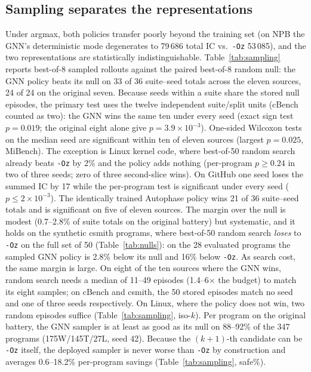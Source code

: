 \documentclass[conference,a4paper]{IEEEtran}
\begin{document}
\subsection{Sampling separates the representations}
Under argmax, both policies transfer poorly beyond the training set
(on NPB the GNN's deterministic mode degenerates to 79\,686 total IC
vs.\ \texttt{-Oz} 53\,085), and the two representations are
statistically indistinguishable.
Table~\ref{tab:sampling} reports best-of-8 sampled rollouts against the
paired best-of-8 random null: the GNN policy beats its null on 33 of 36
suite--seed totals across the eleven sources, 24 of 24 on the original
seven. Because seeds within a suite share the stored null episodes, the
primary test uses the twelve independent suite/split units (cBench
counted as two): the GNN wins the same
ten under every seed (exact sign test $p{=}0.019$; the original eight
alone give $p{=}3.9{\times}10^{-3}$). One-sided Wilcoxon tests on the
median seed are significant within ten of eleven sources (largest
$p{=}0.025$, MiBench). The exception is Linux kernel code, where
best-of-50 random search already beats \texttt{-Oz} by 2\% and the
policy adds nothing (per-program $p{\ge}0.24$ in two of three seeds;
zero of three second-slice wins). On GitHub one seed loses the summed
IC by 17 while the per-program test is significant under every seed
($p{\le}2{\times}10^{-3}$). The identically trained Autophase policy
wins 21 of 36 suite--seed totals and is significant on five of eleven
sources. The margin over the null is
modest (0.7--2.8\% of suite totals on the original battery) but
systematic, and it holds on the synthetic csmith programs, where
best-of-50 random search \emph{loses} to \texttt{-Oz} on the full set
of 50 (Table~\ref{tab:nulls}): on the 28 evaluated programs the sampled
GNN policy is 2.8\% below its null and 16\% below \texttt{-Oz}.
As search cost, the same margin is large. On eight of the ten
sources where the GNN wins, random search needs a median of 11--49
episodes (1.4--6$\times$ the budget) to match its eight samples; on
cBench and csmith, the 50 stored episodes match no seed and one of
three seeds respectively. On Linux, where the policy does not win,
two random episodes suffice (Table~\ref{tab:sampling}, iso-$k$). Per
program on the original battery, the GNN sampler is at least as good
as its null on 88--92\% of the 347 programs (175W/145T/27L, seed 42).
Because the $(k{+}1)$-th candidate can be \texttt{-Oz} itself, the
deployed sampler is never worse than \texttt{-Oz} by construction and
averages 0.6--18.2\% per-program savings (Table~\ref{tab:sampling},
safe\%).
\end{document}
